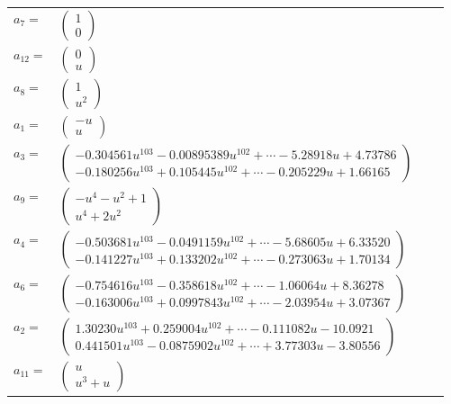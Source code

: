 \documentclass[1p]{elsarticle_modified}
\theoremstyle{definition}
\begin{document}
\begin{tabular}{m{7pt} m{180pt} m{7pt} m{180pt} }
\flushright $a_{7}=$&$\begin{pmatrix}1\\0\end{pmatrix}$ \\
\flushright $a_{12}=$&$\begin{pmatrix}0\\u\end{pmatrix}$ \\
\flushright $a_{8}=$&$\begin{pmatrix}1\\u^2\end{pmatrix}$ \\
\flushright $a_{1}=$&$\begin{pmatrix}- u\\u\end{pmatrix}$ \\
\flushright $a_{3}=$&$\begin{pmatrix}-0.304561 u^{103}-0.00895389 u^{102}+\cdots-5.28918 u+4.73786\\-0.180256 u^{103}+0.105445 u^{102}+\cdots-0.205229 u+1.66165\end{pmatrix}$ \\
\flushright $a_{9}=$&$\begin{pmatrix}- u^4- u^2+1\\u^4+2 u^2\end{pmatrix}$ \\
\flushright $a_{4}=$&$\begin{pmatrix}-0.503681 u^{103}-0.0491159 u^{102}+\cdots-5.68605 u+6.33520\\-0.141227 u^{103}+0.133202 u^{102}+\cdots-0.273063 u+1.70134\end{pmatrix}$ \\
\flushright $a_{6}=$&$\begin{pmatrix}-0.754616 u^{103}-0.358618 u^{102}+\cdots-1.06064 u+8.36278\\-0.163006 u^{103}+0.0997843 u^{102}+\cdots-2.03954 u+3.07367\end{pmatrix}$ \\
\flushright $a_{2}=$&$\begin{pmatrix}1.30230 u^{103}+0.259004 u^{102}+\cdots-0.111082 u-10.0921\\0.441501 u^{103}-0.0875902 u^{102}+\cdots+3.77303 u-3.80556\end{pmatrix}$ \\
\flushright $a_{11}=$&$\begin{pmatrix}u\\u^3+u\end{pmatrix}$ \\

\end{tabular}
\end{document}
